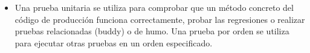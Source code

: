 \begin {itemize}
\subsection {Pruebas Unitarias}
\item Una prueba unitaria se utiliza para comprobar que un método concreto del código de producción funciona correctamente, probar las regresiones o realizar pruebas relacionadas (buddy) o de humo. Una prueba por orden se utiliza para ejecutar otras pruebas en un orden especificado. 
\end{itemize}
